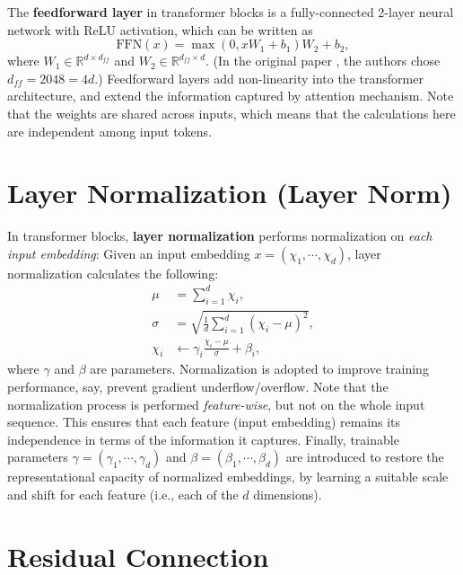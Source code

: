 The \textbf{feedforward layer} in transformer blocks is a fully-connected 2-layer neural network with ReLU activation, which can be written as
$$
\text{FFN}(x) = \max(0, xW_1+b_1)W_2 + b_2,
$$
where $W_1 \in \mathbb{R}^{d\times d_{ff}}$ and $W_2 \in \mathbb{R}^{d_{ff}\times d}$. (In the original paper \cite{vaswani2017attention}, the authors chose $d_{ff} = 2048 = 4d$.)
Feedforward layers add non-linearity into the transformer architecture, and extend the information captured by attention mechanism. Note that the weights are shared across inputs, which means that the calculations here are independent among input tokens.

\section{Layer Normalization (Layer Norm)}

In transformer blocks, \textbf{layer normalization} performs normalization on \textit{each input embedding}: Given an input embedding $x = (\chi_1, \cdots, \chi_d)$, layer normalization calculates the following:
\begin{equation}
\begin{aligned}
    \mu &= \sum_{i=1}^d \chi_i, \\
    \sigma &= \sqrt{\frac{1}{d}\sum_{i=1}^d(\chi_i - \mu)^2}, \\
    \chi_i &\leftarrow \gamma_i\frac{\chi_i - \mu}{\sigma} + \beta_i,
\end{aligned}
\end{equation}
where $\gamma$ and $\beta$ are parameters. Normalization is adopted to improve training performance, say, prevent gradient underflow/overflow. Note that the normalization process is performed \textit{feature-wise}, but not on the whole input sequence. This ensures that each feature (input embedding) remains its independence in terms of the information it captures. Finally, trainable parameters $\gamma = (\gamma_1, \cdots, \gamma_d)$ and $\beta = (\beta_1, \cdots, \beta_d)$ are introduced to restore the representational capacity of normalized embeddings, by learning a suitable scale and shift for each feature (i.e., each of the $d$ dimensions).

\section{Residual Connection}

